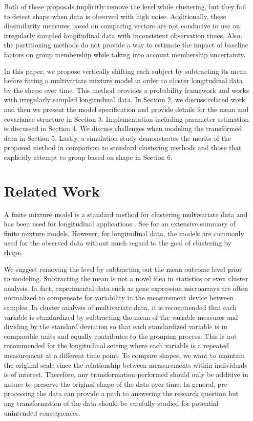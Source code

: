 \documentclass[12pt]{article}
\begin{document}
Both of these proposals implicitly remove the level while clustering, but they fail to detect shape when data is observed with high noise. Additionally, these dissimilarity measures based on comparing vectors are not conducive to use on irregularly sampled longitudinal data with inconsistent observation times. Also, the partitioning methods do not provide a way to estimate the impact of baseline factors on group membership while taking into account membership uncertainty.  

In this paper, we propose vertically shifting each subject by subtracting its mean before fitting a multivariate mixture model in order to cluster longitudinal data by the shape over time. This method provides a probability framework and works with irregularly sampled longitudinal data. In Section 2, we discuss related work and then we present the model specification and provide details for the mean and covariance structure in Section 3. Implementation including parameter estimation is discussed in Section 4. We discuss challenges when modeling the transformed data in Section 5. Lastly, a simulation study demonstrates the merits of the proposed method in comparison to standard clustering methods and those that explicitly attempt to group based on shape in Section 6.

\section{Related Work}
A finite mixture model is a standard method for clustering multivariate data \cite{everitt2009} and has been used for longitudinal applications \cite{muthen2010, jones2001}. See \cite{mclachlan2000} for an extensive summary of finite mixture models. However, for longitudinal data, the models are commonly used for the observed data without much regard to the goal of clustering by shape. 

We suggest removing the level by subtracting out the mean outcome level prior to modeling. Subtracting the mean is not a novel idea in statistics or even cluster analysis. In fact, experimental data such as gene expression microarrays are often normalized to compensate for variability in the measurement device between samples. In cluster analysis of multivariate data, it is recommended that each variable is standardized by subtracting the mean of the variable measures and dividing by the standard deviation so that each standardized variable is in comparable units and equally contributes to the grouping process. This is not recommended for the longitudinal setting where each variable is a repeated measurement at a different time point. To compare shapes, we want to maintain the original scale since the relationship between measurements within individuals is of interest. Therefore, any transformation performed should only be additive in nature to preserve the original shape of the data over time. In general, pre-processing the data can provide a path to answering the research question but any transformation of the data should be carefully studied for potential unintended consequences.
\end{document}

